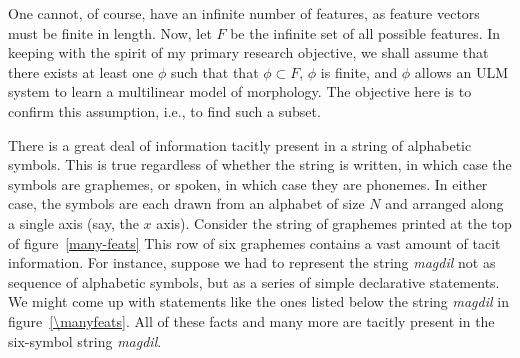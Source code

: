 One cannot, of course, have an infinite number of features, as feature vectors must be finite in length.
Now, let $F$ be the infinite set of all possible features. In keeping with the spirit of my primary research objective, we shall assume that there exists at least one $\phi$ such that that $\phi \subset F$, $\phi$ is finite, and $\phi$ allows an ULM system to learn a multilinear model of morphology. The objective here is to confirm this assumption, i.e., to find such a subset.

There is a great deal of information tacitly present in a string of alphabetic symbols.
	 This is true regardless of whether the string is written, in which case the 
	 symbols are graphemes, or spoken, in which case they are phonemes. In either 
	 case, the symbols are each drawn from an alphabet of size $N$ and arranged 
	 along a single axis (say, the $x$ axis).
Consider the string of graphemes printed at the top of figure~\ref{many-feats}
This row of six graphemes contains a vast amount of tacit information. For instance, 
suppose we had to represent the string \textit{magdil} not as sequence of alphabetic 
symbols, but as a series of simple declarative statements. We might come up with 
statements like the ones listed below the string \textit{magdil} in figure~\ref{\manyfeats}. All of these
facts and many more are tacitly present in the six-symbol string \textit{magdil}.

